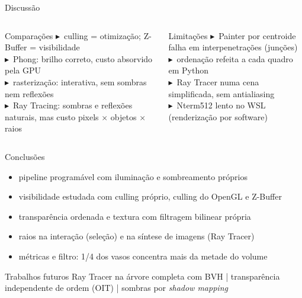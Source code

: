 \documentclass[aspectratio=169,11pt]{beamer}
\newcommand{\checkitem}{\textcolor{ufopred}{$\blacktriangleright$}}
\begin{document}
\begin{frame}{Discussão}
\begin{columns}[t]
\begin{block}{Comparações}
\small
\checkitem\ culling = otimização; Z-Buffer = visibilidade\\
\checkitem\ Phong: brilho correto, custo absorvido pela GPU\\
\checkitem\ rasterização: interativa, sem sombras nem reflexões\\
\checkitem\ Ray Tracing: sombras e reflexões naturais, mas custo pixels $\times$ objetos $\times$ raios
\end{block}
\begin{block}{Limitações}
\small
\checkitem\ Painter por centroide falha em interpenetrações (junções)\\
\checkitem\ ordenação refeita a cada quadro em Python\\
\checkitem\ Ray Tracer numa cena simplificada, sem antialiasing\\
\checkitem\ Nterm512 lento no WSL (renderização por software)
\end{block}
\end{columns}
\end{frame}

\begin{frame}{Conclusões}
\begin{itemize}
  \item[\checkitem] pipeline programável com iluminação e sombreamento próprios
  \item[\checkitem] visibilidade estudada com culling próprio, culling do OpenGL e Z-Buffer
  \item[\checkitem] transparência ordenada e textura com filtragem bilinear própria
  \item[\checkitem] raios na interação (seleção) e na síntese de imagens (Ray Tracer)
  \item[\checkitem] métricas e filtro: 1/4 dos vasos concentra mais da metade do volume
\end{itemize}
\vspace{0.2cm}
\begin{block}{Trabalhos futuros}
Ray Tracer na árvore completa com BVH | transparência independente de ordem (OIT) | sombras por \emph{shadow mapping}
\end{block}
\end{frame}
\end{document}
